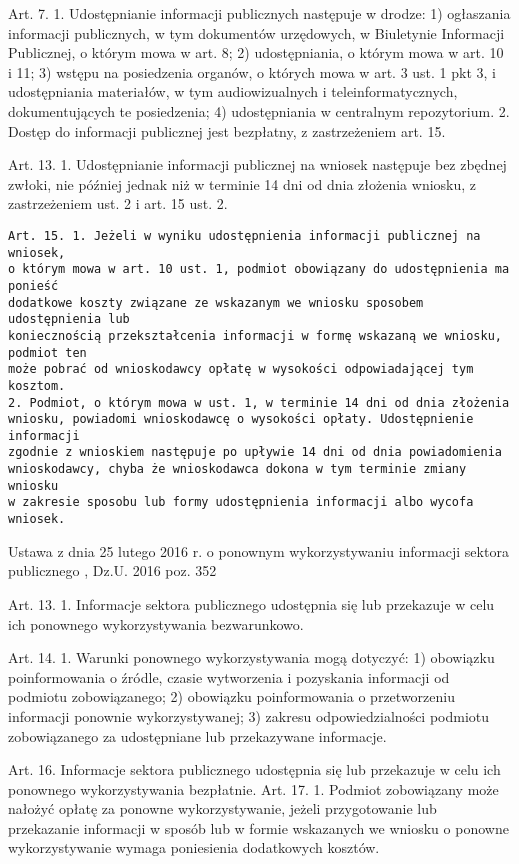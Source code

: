 Art. 7. 1. Udostępnianie informacji publicznych następuje w drodze:
1) ogłaszania informacji publicznych, w tym dokumentów urzędowych, w Biuletynie Informacji Publicznej, o którym mowa w art. 8;
2) udostępniania, o którym mowa w art. 10 i 11;
3) wstępu na posiedzenia organów, o których mowa w art. 3 ust. 1 pkt 3, i udostępniania materiałów, w tym audiowizualnych i teleinformatycznych, dokumentujących te posiedzenia;
4) udostępniania w centralnym repozytorium.
2. Dostęp do informacji publicznej jest bezpłatny, z zastrzeżeniem art. 15.

Art. 13. 1. Udostępnianie informacji publicznej na wniosek następuje bez zbędnej zwłoki, nie później jednak niż w terminie 14 dni od dnia złożenia wniosku, z zastrzeżeniem ust. 2 i art. 15 ust. 2.
\begin{lstlisting}
Art. 15. 1. Jeżeli w wyniku udostępnienia informacji publicznej na wniosek,
o którym mowa w art. 10 ust. 1, podmiot obowiązany do udostępnienia ma ponieść
dodatkowe koszty związane ze wskazanym we wniosku sposobem udostępnienia lub
koniecznością przekształcenia informacji w formę wskazaną we wniosku, podmiot ten
może pobrać od wnioskodawcy opłatę w wysokości odpowiadającej tym kosztom.
2. Podmiot, o którym mowa w ust. 1, w terminie 14 dni od dnia złożenia
wniosku, powiadomi wnioskodawcę o wysokości opłaty. Udostępnienie informacji
zgodnie z wnioskiem następuje po upływie 14 dni od dnia powiadomienia
wnioskodawcy, chyba że wnioskodawca dokona w tym terminie zmiany wniosku
w zakresie sposobu lub formy udostępnienia informacji albo wycofa wniosek.
\end{lstlisting}
Ustawa z dnia 25 lutego 2016 r. o ponownym wykorzystywaniu informacji sektora publicznego
, Dz.U. 2016 poz. 352

Art. 13. 1. Informacje sektora publicznego udostępnia się lub przekazuje w celu
ich ponownego wykorzystywania bezwarunkowo.

Art. 14. 1. Warunki ponownego wykorzystywania mogą dotyczyć:
1) obowiązku poinformowania o źródle, czasie wytworzenia i pozyskania
informacji od podmiotu zobowiązanego;
2) obowiązku poinformowania o przetworzeniu informacji ponownie
wykorzystywanej;
3) zakresu odpowiedzialności podmiotu zobowiązanego za udostępniane lub
przekazywane informacje.

Art. 16. Informacje sektora publicznego udostępnia się lub przekazuje w celu
ich ponownego wykorzystywania bezpłatnie.
Art. 17. 1. Podmiot zobowiązany może nałożyć opłatę za ponowne
wykorzystywanie, jeżeli przygotowanie lub przekazanie informacji w sposób lub
w formie wskazanych we wniosku o ponowne wykorzystywanie wymaga
poniesienia dodatkowych kosztów.
